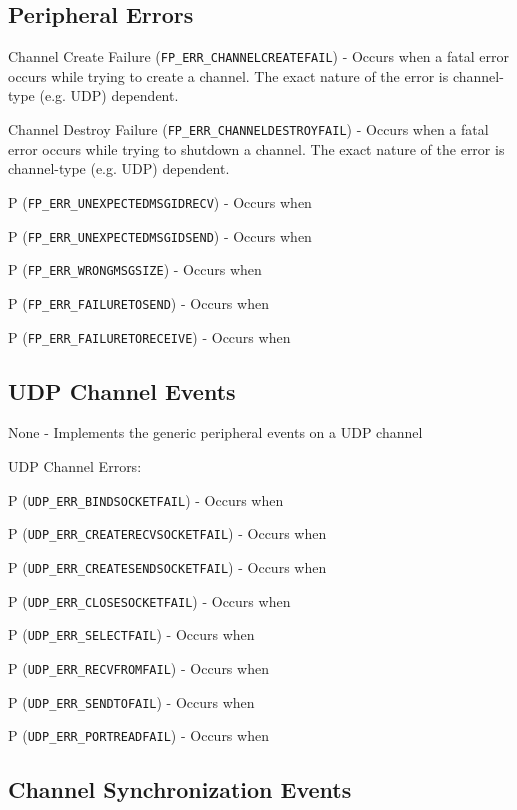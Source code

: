 \subsection{Peripheral Errors}

Channel Create Failure (\texttt{FP\_ERR\_CHANNELCREATEFAIL}) - Occurs when a fatal error occurs while trying to create a channel.  The exact nature of the error is channel-type (e.g. UDP) dependent.

Channel Destroy Failure (\texttt{FP\_ERR\_CHANNELDESTROYFAIL}) - Occurs when a fatal error occurs while trying to shutdown a channel.  The exact nature of the error is channel-type (e.g. UDP) dependent.

P (\texttt{FP\_ERR\_UNEXPECTEDMSGIDRECV}) - Occurs when

P (\texttt{FP\_ERR\_UNEXPECTEDMSGIDSEND}) - Occurs when

P (\texttt{FP\_ERR\_WRONGMSGSIZE}) - Occurs when

P (\texttt{FP\_ERR\_FAILURETOSEND}) - Occurs when

P (\texttt{FP\_ERR\_FAILURETORECEIVE}) - Occurs when



\subsection{UDP Channel Events}

None - Implements the generic peripheral events on a UDP channel


UDP Channel Errors:

P (\texttt{UDP\_ERR\_BINDSOCKETFAIL}) - Occurs when

P (\texttt{UDP\_ERR\_CREATERECVSOCKETFAIL}) - Occurs when

P (\texttt{UDP\_ERR\_CREATESENDSOCKETFAIL}) - Occurs when

P (\texttt{UDP\_ERR\_CLOSESOCKETFAIL}) - Occurs when

P (\texttt{UDP\_ERR\_SELECTFAIL}) - Occurs when

P (\texttt{UDP\_ERR\_RECVFROMFAIL}) - Occurs when

P (\texttt{UDP\_ERR\_SENDTOFAIL}) - Occurs when

P (\texttt{UDP\_ERR\_PORTREADFAIL}) - Occurs when



\subsection{Channel Synchronization Events}


